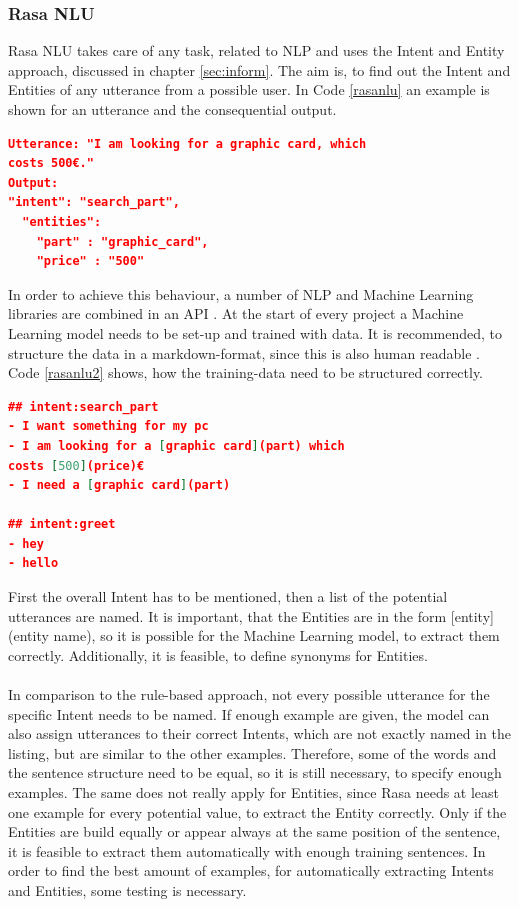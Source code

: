 \documentclass[10pt,final,journal,a4paper,oneside,twocolumn]{IEEEtran}
\begin{document}
\subsubsection{Rasa NLU}
Rasa NLU takes care of any task, related to NLP and uses the Intent and Entity approach, discussed in chapter \ref{sec:inform}. The aim is, to find out the Intent and Entities of any utterance from a possible user. In Code \ref{rasanlu} an example is shown for an utterance and the consequential output.
\begin{lstlisting}[caption={Potential output of Rasa NLU for a given utterance (based on \cite{b22}).}, label=rasanlu, lineskip=1pt, language=json, morekeywords={intent, entities, part, price}]
Utterance: "I am looking for a graphic card, which 
costs 500€."
Output:
"intent": "search_part",
  "entities":
    "part" : "graphic_card",
    "price" : "500"
\end{lstlisting}
In order to achieve this behaviour, a number of NLP and Machine Learning libraries are combined in an API \cite{b22}. At the start of every project a Machine Learning model needs to be set-up and trained with data. It is recommended, to structure the data in a markdown-format, since this is also human readable \cite{b22}. Code \ref{rasanlu2} shows, how the training-data need to be structured correctly. 
\begin{lstlisting}[caption={Trainings data for Rasa NLU (based on \cite{b22}).}, label=rasanlu2, lineskip=1pt, language=json,
morekeywords={intent, entities, part, price, graphic card, 500}]
## intent:search_part
- I want something for my pc
- I am looking for a [graphic card](part) which 
costs [500](price)€
- I need a [graphic card](part)

## intent:greet
- hey
- hello
\end{lstlisting}
First the overall Intent has to be mentioned, then a list of the potential utterances are named. It is important, that the Entities are in the form [entity](entity name), so it is possible for the Machine Learning model, to extract them correctly. Additionally, it is feasible, to define synonyms for Entities. \\
\\
In comparison to the rule-based approach, not every possible utterance for the specific Intent needs to be named. If enough example are given, the model can also assign utterances to their correct Intents, which are not exactly named in the listing, but are similar to the other examples. Therefore, some of the words and the sentence structure need to be equal, so it is still necessary, to specify enough examples. The same does not really apply for Entities, since Rasa needs at least one example for every potential value, to extract the Entity correctly. Only if the Entities are build equally or appear always at the same position of the sentence, it is feasible to extract them automatically with enough training sentences. In order to find the best amount of examples, for automatically extracting Intents and Entities, some testing is necessary.\\
\end{document}
